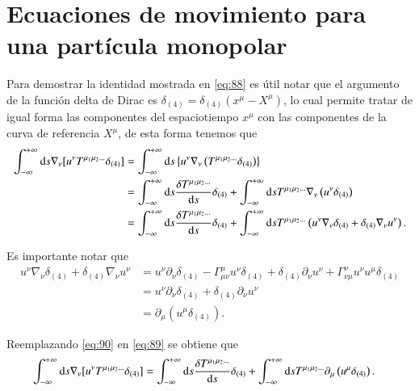 \chapter{Ecuaciones de movimiento para una part\'icula monopolar}
\label{ape:1}

Para demostrar la identidad mostrada en \eqref{eq:88} es \'util notar que el argumento de la funci\'on delta de Dirac es $\delta_{(4)}=\delta_{(4)}(x^{\mu}-X^{\mu})$, lo cual permite tratar de igual forma las componentes del espaciotiempo $x^{\mu}$ con las componentes de la curva de referencia $X^{\mu}$, de esta forma tenemos que
\begin{align}
\nonumber
\int_{-\infty}^{+\infty} \mathrm{d}s \nabla_{\nu} [u^{\nu} T^{\mu_1 \mu_2 \dots} \delta_{(4)}] &=
\int_{-\infty}^{+\infty} \mathrm{d}s \left\{ u^{\nu} \nabla_{\nu} \left( T^{\mu_1 \mu_2 \dots} \delta_{(4)} \right)  \right\}\\
\nonumber
&= \int_{-\infty}^{+\infty} \mathrm{d}s \frac{\delta T^{\mu_1 \mu_2 \dots}}{\mathrm{d}s} \delta_{(4)} + \int_{-\infty}^{+\infty} \mathrm{d}s T^{\mu_1 \mu_2 \dots} \nabla_{\nu} \left( u^{\nu} \delta_{(4)} \right)\\
\label{eq:89}
&= \int_{-\infty}^{+\infty} \mathrm{d}s \frac{\delta T^{\mu_1 \mu_2 \dots}}{\mathrm{d}s} \delta_{(4)} + \int_{-\infty}^{+\infty} \mathrm{d}s T^{\mu_1 \mu_2 \dots} \left( u^{\nu} \nabla_{\nu} \delta_{(4)} + \delta_{(4)} \nabla_{\nu} u^{\nu} \right).
\end{align}

Es importante notar que
\begin{align}
u^{\nu} \nabla_{\nu} \delta_{(4)} + \delta_{(4)} \nabla_{\nu} u^{\nu} &= u^{\nu} \partial_{\nu} \delta_{(4)} - \Gamma^{\mu}_{\mu \nu} u^{\nu} \delta_{(4)} + \delta_{(4)} \partial_{\nu} u^{\nu} + \Gamma^{\nu}_{\nu \mu} u^{\nu} u^{\mu} \delta_{(4)} \nonumber \\
&= u^{\nu} \partial_{\nu} \delta_{(4)} + \delta_{(4)} \partial_{\nu} u^{\nu} \nonumber \\
\label{eq:90}
&= \partial_{\mu} \left( u^{\mu} \delta_{(4)} \right).
\end{align}

Reemplazando \eqref{eq:90} en \eqref{eq:89} se obtiene que
\begin{align}
\int_{-\infty}^{+\infty} \mathrm{d}s \nabla_{\nu} [u^{\nu} T^{\mu_1 \mu_2 \dots} \delta_{(4)}] &= \int_{-\infty}^{+\infty} \mathrm{d}s \frac{\delta T^{\mu_1 \mu_2 \dots}}{\mathrm{d}s} \delta_{(4)} + \int_{-\infty}^{+\infty} \mathrm{d}s T^{\mu_1 \mu_2 \dots} \partial_{\mu} \left( u^{\mu} \delta_{(4)} \right).
\end{align}

